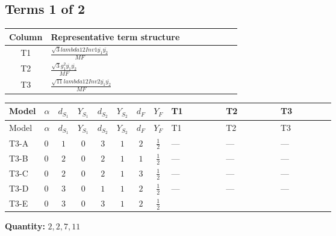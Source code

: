 \documentclass[8pt]{article}
\begin{document}
\begin{landscape}
\subsection*{Terms 1 of 2}
\begin{center}
\begin{tabular}{@{}c >{\raggedright\arraybackslash}p{0.82\linewidth}@{}}
\toprule
Column & Representative term structure \\
\midrule
T1 & \(\displaystyle \frac{\sqrt{3} lambda12Inv1 \overline{y_{1}} \overline{y_{2}}}{MF}\) \\
\midrule
T2 & \(\displaystyle \frac{\sqrt{3} g_{1}^{2} \overline{y_{1}} \overline{y_{2}}}{MF}\) \\
\midrule
T3 & \(\displaystyle \frac{\sqrt{11} lambda12Inv2 \overline{y_{1}} \overline{y_{2}}}{MF}\) \\
\midrule
\bottomrule
\end{tabular}
\end{center}
\smallskip
\tiny
\begin{longtable}{@{}llcccccc >{\raggedright\arraybackslash}p{0.21\linewidth} >{\raggedright\arraybackslash}p{0.21\linewidth} >{\raggedright\arraybackslash}p{0.21\linewidth}@{}}
\toprule
Model & $\alpha$ & $d_{S_1}$ & $Y_{S_1}$ & $d_{S_2}$ & $Y_{S_2}$ & $d_F$ & $Y_F$ & T1 & T2 & T3 \\
\midrule
\endfirsthead
\toprule
Model & $\alpha$ & $d_{S_1}$ & $Y_{S_1}$ & $d_{S_2}$ & $Y_{S_2}$ & $d_F$ & $Y_F$ & T1 & T2 & T3 \\
\midrule
\endhead
T3-A & $0$ & $1$ & $0$ & $3$ & $1$ & $2$ & $\frac{1}{2}$ & --- & --- & --- \\
\midrule
T3-B & $0$ & $2$ & $0$ & $2$ & $1$ & $1$ & $\frac{1}{2}$ & --- & --- & --- \\
\midrule
T3-C & $0$ & $2$ & $0$ & $2$ & $1$ & $3$ & $\frac{1}{2}$ & --- & --- & --- \\
\midrule
T3-D & $0$ & $3$ & $0$ & $1$ & $1$ & $2$ & $\frac{1}{2}$ & --- & --- & --- \\
\midrule
T3-E & $0$ & $3$ & $0$ & $3$ & $1$ & $2$ & $\frac{1}{2}$ & \scriptsize\adjustbox{max width=\linewidth}{$\begin{gathered} - \frac{\sqrt{3} lambda12Inv1 \overline{y_{1}} \overline{y_{2}}}{6 MF}\end{gathered}$} & \scriptsize\adjustbox{max width=\linewidth}{$\begin{gathered} \frac{\sqrt{3} g_{1}^{2} \overline{y_{1}} \overline{y_{2}}}{8 MF}\end{gathered}$} & \scriptsize\adjustbox{max width=\linewidth}{$\begin{gathered} \frac{3 \sqrt{11} lambda12Inv2 \overline{y_{1}} \overline{y_{2}}}{22 MF}\end{gathered}$} \\
\midrule
\bottomrule
\end{longtable}
\clearpage
\noindent\textbf{Quantity: }$\mathrm{2,2,7,11}$\par\smallskip

\end{landscape}
\end{document}
